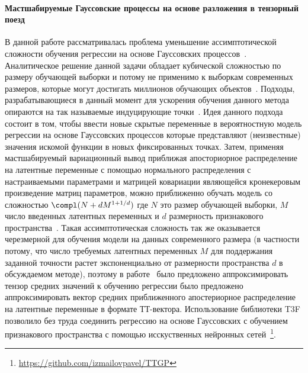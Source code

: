 \paragraph{Мастшабируемые Гауссовские процессы на основе разложения в тензорный поезд} В данной работе рассматривалась проблема уменьшение ассимптотической сложности обучения регрессии на основе Гауссовских процессов~\cite{GP}. Аналитическое решение данной задачи обладает кубической сложностью по размеру обучающей выборки и потому не применимо к выборкам современных размеров, которые могут достигать миллионов обучающих объектов~\cite{Russakovsky2015ImageNet}. Подходы, разрабатывающиеся в данный момент для ускорения обучения данного метода опираются на так называемые индуцирующие точки~\cite{candela2005}. Идея данного подхода состоит в том, чтобы ввести новые скрытые переменные в вероятностную модель регрессии на основе Гауссовских процессов которые представляют (неизвестные) значения искомой функции в новых фиксированных точках. Затем, применяя мастшабируемый вариационный вывод приближая апосториорное распределение на латентные переменные с помощью нормального распределения с настраиваемыми параметрами и матрицей ковариации являющейся кронекеровым произведение матриц параметров, можно приближенно обучать модель со сложностью $\compl(N+ d M^{1 + 1/d})$ где $N$ это размер обучающей выборки, $M$ число введенных латентных переменных и $d$ размерность признакового пространства~\cite{wilson2015}. Такая ассимптотическая сложность так же оказывается черезмерной для обучения модели на данных современного размера (в частности потому, что число требуемых латентных переменных $M$ для поддержания заданной точности растет экспоненциально от размерности пространства $d$ в обсуждаемом методе), поэтому в работе~\cite{izmailov2018scalable} было предложено аппроксимировать тензор средних значений к обучению регрессии было предложено аппроксимировать вектор средних приближенного апостериорное распределение на латентные переменные в формате ТТ-вектора. Использование библиотеки T3F позволило без труда соединить регрессию на основе Гауссовских с обучением признакового пространства с помощью исскуственных нейронных сетей~\footnote{\url{https://github.com/izmailovpavel/TTGP}}.

